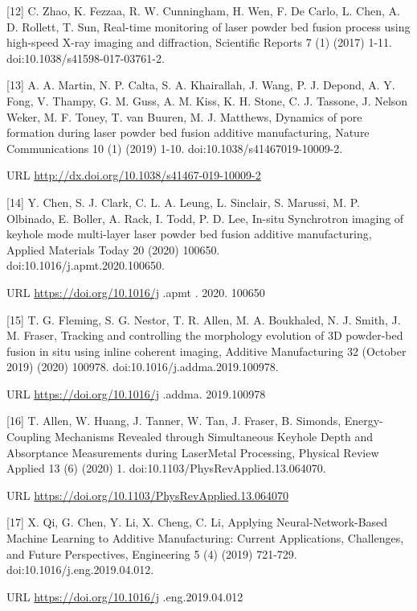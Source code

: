 \documentclass[10pt]{article}
\begin{document}
[12] C. Zhao, K. Fezzaa, R. W. Cunningham, H. Wen, F. De Carlo, L. Chen, A. D. Rollett, T. Sun, Real-time monitoring of laser powder bed fusion process using high-speed X-ray imaging and diffraction, Scientific Reports 7 (1) (2017) 1-11. doi:10.1038/s41598-017-03761-2.

[13] A. A. Martin, N. P. Calta, S. A. Khairallah, J. Wang, P. J. Depond, A. Y. Fong, V. Thampy, G. M. Guss, A. M. Kiss, K. H. Stone, C. J. Tassone, J. Nelson Weker, M. F. Toney, T. van Buuren, M. J. Matthews, Dynamics of pore formation during laser powder bed fusion additive manufacturing, Nature Communications 10 (1) (2019) 1-10. doi:10.1038/s41467019-10009-2.

URL \href{http://dx.doi.org/10.1038/s41467-019-10009-2}{http://dx.doi.org/10.1038/s41467-019-10009-2}

[14] Y. Chen, S. J. Clark, C. L. A. Leung, L. Sinclair, S. Marussi, M. P. Olbinado, E. Boller, A. Rack, I. Todd, P. D. Lee, In-situ Synchrotron imaging of keyhole mode multi-layer laser powder bed fusion additive manufacturing, Applied Materials Today 20 (2020) 100650.\\
doi:10.1016/j.apmt.2020.100650.

URL \href{https://doi.org/10.1016/j}{https://doi.org/10.1016/j} .apmt . 2020. 100650

[15] T. G. Fleming, S. G. Nestor, T. R. Allen, M. A. Boukhaled, N. J. Smith, J. M. Fraser, Tracking and controlling the morphology evolution of 3D powder-bed fusion in situ using inline coherent imaging, Additive Manufacturing 32 (October 2019) (2020) 100978. doi:10.1016/j.addma.2019.100978.

URL \href{https://doi.org/10.1016/j}{https://doi.org/10.1016/j} .addma. 2019.100978

[16] T. Allen, W. Huang, J. Tanner, W. Tan, J. Fraser, B. Simonds, Energy-Coupling Mechanisms Revealed through Simultaneous Keyhole Depth and Absorptance Measurements during LaserMetal Processing, Physical Review Applied 13 (6) (2020) 1. doi:10.1103/PhysRevApplied.13.064070.

URL \href{https://doi.org/10.1103/PhysRevApplied.13.064070}{https://doi.org/10.1103/PhysRevApplied.13.064070}

[17] X. Qi, G. Chen, Y. Li, X. Cheng, C. Li, Applying Neural-Network-Based Machine Learning to Additive Manufacturing: Current Applications, Challenges, and Future Perspectives, Engineering 5 (4) (2019) 721-729. doi:10.1016/j.eng.2019.04.012.

URL \href{https://doi.org/10.1016/j}{https://doi.org/10.1016/j} .eng.2019.04.012
\end{document}
